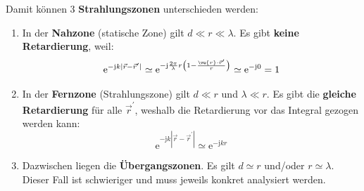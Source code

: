	Damit können 3 \textbf{Strahlungszonen} unterschieden werden:
	  \begin{enumerate}
		  \item In der \textbf{Nahzone} (statische Zone) gilt \(d \ll r \ll \lambda\). Es gibt \textbf{keine Retardierung}, weil:
		        \begin{equation}
			        \mathrm{e}^{-\mathrm{j} k |\vec{r} -\vec{r}^\prime |} \simeq  \mathrm{e}^{-\mathrm{j}\frac{2\pi}{\lambda}r \left(1 - \frac{\vu{r}\cdot \vec{r}^\prime }{r} \right) } \simeq  \mathrm{e}^{-\mathrm{j}0} =1  
		        \end{equation}
		  \item In der \textbf{Fernzone} (Strahlungszone) gilt \(d \ll r\) und \(\lambda \ll r\). Es gibt die \textbf{gleiche Retardierung} für alle $\vec{r}^\prime$, weshalb die Retardierung vor das Integral gezogen werden kann: 
		        \begin{equation}
			        \mathrm{e}^{-\mathrm{j} k |\vec{r} -\vec{r}^\prime |} \simeq  \mathrm{e}^{-\mathrm{j} k r} 
		        \end{equation}
		\item Dazwischen liegen die \textbf{Übergangszonen}. Es gilt \(d \simeq r\) und/oder \(r\simeq\lambda\). Dieser Fall ist schwieriger und muss jeweils konkret analysiert werden.
	  \end{enumerate}